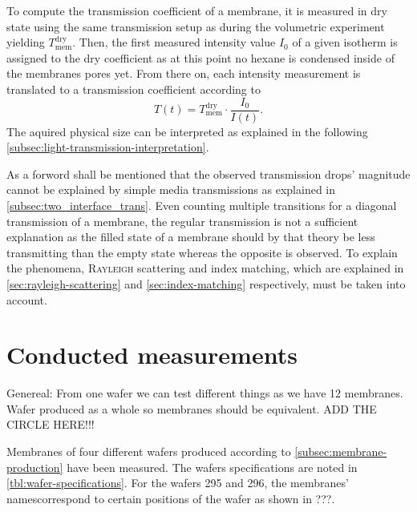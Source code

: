 \documentclass[../thesis.tex]{subfiles}
\begin{document}
          To compute the transmission coefficient of a membrane, it is measured in dry state using the same transmission setup as during the volumetric experiment yielding $T_\mathrm{mem}^\mathrm{dry}$. Then, the first measured intensity value $I_0$ of a given isotherm is assigned to the dry coefficient as at this point no hexane is condensed inside of the membranes pores yet. From there on, each intensity measurement is translated to a transmission coefficient according to
          \begin{equation}
              T(t) = T_\mathrm{mem}^\mathrm{dry} \cdot \frac{I_0}{I(t)}.
          \end{equation}
          The aquired physical size can be interpreted as explained in the following  \cref{subsec:light-transmission-interpretation}.

          As a forword shall be mentioned that the observed transmission drops' magnitude cannot be explained by simple media transmissions as explained in \cref{subsec:two_interface_trans}. Even counting multiple transitions for a diagonal transmission of a membrane, the regular transmission is not a sufficient explanation as the filled state of a membrane should by that theory be less transmitting than the empty state whereas the opposite is observed. To explain the phenomena, \textsc{Rayleigh} scattering and index matching, which are explained in \cref{sec:rayleigh-scattering} and \cref{sec:index-matching} respectively, must be taken into account.


      \section{Conducted measurements}
      \label{sec:conducted-measurements}

        Genereal: From one wafer we can test different things as we have 12 membranes. Wafer produced as a whole so membranes should be equivalent. ADD THE CIRCLE HERE!!!
        \medskip

        Membranes of four different wafers produced according to \cref{subsec:membrane-production} have been measured. The wafers specifications are noted in \cref{tbl:wafer-specifications}. For the wafers 295 and 296, the membranes' namescorrespond to certain positions of the wafer as shown in ???.
\end{document}
